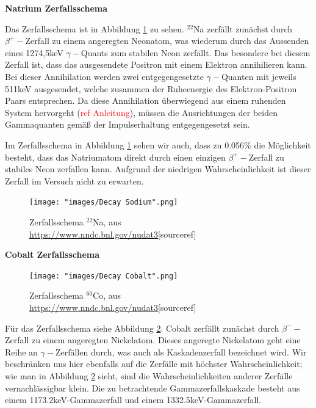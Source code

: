 \documentclass[%
aps,
onecolumn,
11pt,
tightenlines,
nofootinbib,
superscriptaddress,
floatfix,
prd,
]{revtex4-2}
\begin{document}
\textbf{Natrium Zerfallsschema} \par
Das Zerfallsschema ist in Abbildung \ref{fig:decaysodium} zu sehen. $^{22}$Na zerfällt zunächst durch $\beta^+ -$Zerfall zu einem angeregten Neonatom, was wiederum durch das Aussenden eines 1274,5keV $\gamma-$Quants zum stabilen Neon zerfällt. Das besondere bei diesem Zerfall ist, dass das ausgesendete Positron mit einem Elektron annihilieren kann. Bei dieser Annihilation werden zwei entgegengesetzte $\gamma-$Quanten mit jeweils 511keV ausgesendet, welche zusammen der Ruheenergie des Elektron-Positron Paars entsprechen. Da diese Annihilation überwiegend aus einem ruhenden System hervorgeht (\textcolor{red}{ref Anleitung}), müssen die Ausrichtungen der beiden Gammaquanten gemäß der Impulserhaltung entgegengesetzt sein. \par
Im Zerfallsschema in Abbildung \ref{fig:decaysodium} sehen wir auch, dass zu 0.056$\%$ die Möglichkeit besteht, dass das Natriumatom direkt durch einen einzigen $\beta^+ -$Zerfall zu stabiles Neon zerfallen kann. Aufgrund der niedrigen Wahrscheinlichkeit ist dieser Zerfall im Versuch nicht zu erwarten.
\begin{figure}[ht]
	\texttt{[image: "images/Decay Sodium".png]}
	\caption{Zerfallsschema $^{22}$Na, aus \url{https://www.nndc.bnl.gov/nudat3}[sourceref]}
	\label{fig:decaysodium}
\end{figure}

\noindent \textbf{Cobalt Zerfallsschema}\\
\begin{figure}[ht]
	\texttt{[image: "images/Decay Cobalt".png]}
	\caption{Zerfallsschema $^{60}$Co, aus \url{https://www.nndc.bnl.gov/nudat3}[sourceref]}
	\label{fig:decaycobalt}
\end{figure}
Für das Zerfallsschema siehe Abbildung \ref{fig:decaycobalt}. Cobalt zerfällt zunächst durch $\beta^- -$Zerfall zu einem angeregten Nickelatom. Dieses angeregte Nickelatom geht eine Reihe an $\gamma -$Zerfällen durch, was auch als Kaskadenzerfall bezeichnet wird. Wir beschränken uns hier ebenfalls auf die Zerfälle mit höchster Wahrscheinlichkeit; wie man in Abbildung \ref{fig:decaycobalt} sieht, sind die Wahrscheinlichkeiten anderer Zerfälle vernachlässigbar klein. Die zu betrachtende Gammazerfallskaskade besteht aus einem 1173.2keV-Gammazerfall und einem 1332.5keV-Gammazerfall. 
\end{document}
